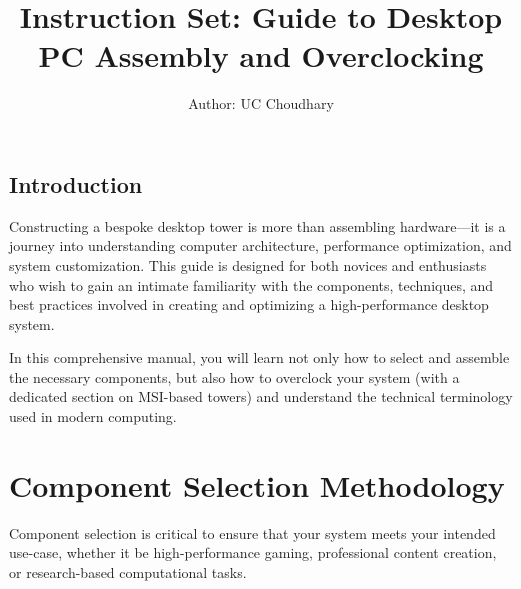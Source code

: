 \documentclass{article}
\title{Instruction Set: Guide to Desktop PC Assembly and Overclocking}
\author{Author: UC Choudhary}
\date{}
\begin{document}
\maketitle
\thispagestyle{fancy}

\tableofcontents
\newpage

\begin{tcolorbox}[
  colback=backcolour,            %
  colframe=blue!75!black,    %
  title={Introduction},
  fonttitle=\bfseries\large,
  arc=4mm,                  %
  boxrule=1pt,              %
  left=10pt, right=10pt,    %
  top=10pt, bottom=10pt,    %
  enhanced
]
\section{Introduction}
Constructing a bespoke desktop tower is more than assembling hardware—it is a journey into understanding computer architecture, performance optimization, and system customization. This guide is designed for both novices and enthusiasts who wish to gain an intimate familiarity with the components, techniques, and best practices involved in creating and optimizing a high-performance desktop system. 

In this comprehensive manual, you will learn not only how to select and assemble the necessary components, but also how to overclock your system (with a dedicated section on MSI-based towers) and understand the technical terminology used in modern computing.
\end{tcolorbox}

\section{Component Selection Methodology}
Component selection is critical to ensure that your system meets your intended use-case, whether it be high-performance gaming, professional content creation, or research-based computational tasks.
\end{document}
